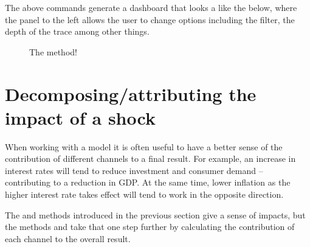 \documentclass[letterpaper,10pt,english]{jupyterBook}
\begin{document}
\begin{sphinxVerbatim}[commandchars=\\\{\}]
  
\end{sphinxVerbatim}

\sphinxAtStartPar
The above commands generate a dashboard that looks a like the below, where the panel to the left allows the user to change options including the filter, the depth of the trace among other things.

\begin{figure}[htbp]
\centering
\capstart

\noindent{}
\caption{The  method!}\label{\detokenize{content/06_ModelAnalytics/ModelStructure:dash}}\end{figure}

\sphinxstepscope


\chapter{Decomposing/attributing the impact of a shock}
\label{\detokenize{content/06_ModelAnalytics/Attribution:decomposing-attributing-the-impact-of-a-shock}}\label{\detokenize{content/06_ModelAnalytics/Attribution::doc}}
\sphinxAtStartPar
When working with a model it is often useful to have a better sense of the contribution of different channels to a final result.  For example, an increase in interest rates will tend to reduce investment and consumer demand – contributing to a reduction in GDP. At the same time, lower inflation as the higher interest rate takes effect will tend to work in the opposite direction.

\sphinxAtStartPar
The  and  methods introduced in the previous section give a sense of impacts, but the  methods  and  take that one step further by calculating the  contribution of each channel to the overall result.
\end{document}
